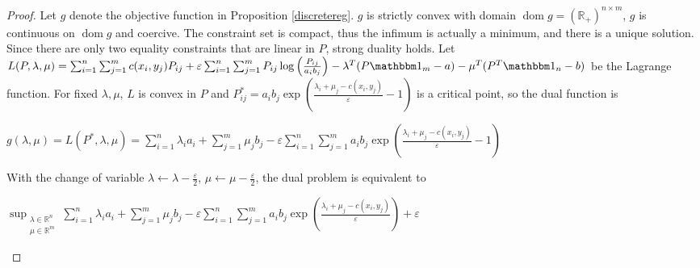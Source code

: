 \documentclass[12pt]{report}
\theoremstyle{definition}
\theoremstyle{remark}
\DeclareMathOperator{\dom}{dom}
\begin{document}
\begin{proof}
	Let $g$ denote the objective function in Proposition \ref{discretereg}. $g$ is strictly convex with domain $\dom g=(\mathbb R_+)^{n\times m}$, $g$ is continuous on $\dom g$ and coercive. The constraint set is compact, thus the infimum is actually a minimum, and there is a unique solution.\\
	Since there are only two equality constraints that are linear in $P$, strong duality holds. Let \\$L(P,\lambda,\mu)=\sum_{i=1}^n\sum_{j=1}^m c(x_i,y_j)P_{ij} + \varepsilon \sum_{i=1}^n\sum_{j=1}^m P_{ij}\log\left(\frac{P_{ij}}{a_i b_j} \right) - \lambda^T(P\mathbbm 1_m-a) - \mu^T(P^T \mathbbm 1_n -b)$ be the Lagrange function. For fixed $\lambda, \mu$, $L$ is convex in $P$ and $P_{ij}^* =a_i b_j \exp\left(\frac{\lambda_i+\mu_j-c(x_i,y_j)}{\varepsilon}-1 \right)$ is a critical point, so the dual function is \begin{center}
		$g(\lambda, \mu) = L(P^*,\lambda,\mu) = \sum_{i=1}^n \lambda_i a_i+\sum_{j=1}^m \mu_j b_j - \varepsilon \sum_{i=1}^n\sum_{j=1}^m a_i b_j \exp\left(\frac{\lambda_i+\mu_j-c(x_i,y_j)}{\varepsilon}-1 \right)$
	\end{center}
		With the change of variable $\lambda \leftarrow \lambda-\frac{\varepsilon}2$, $\mu \leftarrow \mu-\frac{\varepsilon}2$, the dual problem is equivalent to
	\begin{center}
		$\displaystyle \sup_{\substack{\lambda\in \mathbb R^n\\ \mu\in \mathbb R^m}} \sum_{i=1}^n \lambda_i a_i+\sum_{j=1}^m \mu_j b_j - \varepsilon \sum_{i=1}^n\sum_{j=1}^m a_i b_j \exp\left(\frac{\lambda_i+\mu_j-c(x_i,y_j)}{\varepsilon}\right) + \varepsilon$
	\end{center}
\end{proof}
\end{document}

